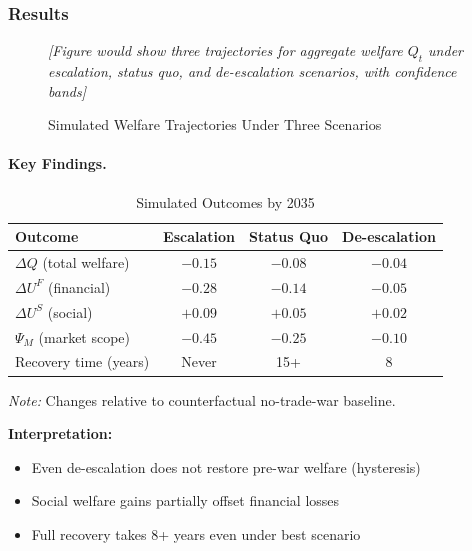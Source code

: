 \subsubsection{Results}

\begin{figure}[htbp]
\centering
\caption{Simulated Welfare Trajectories Under Three Scenarios}
\label{fig:scenarios}
\begin{center}
\textit{[Figure would show three trajectories for aggregate welfare $Q_t$ under escalation, status quo, and de-escalation scenarios, with confidence bands]}
\end{center}
\end{figure}

\paragraph{Key Findings.}

\begin{table}[htbp]
\centering
\caption{Simulated Outcomes by 2035}
\label{tab:simulation-results}
\begin{tabular}{@{}lccc@{}}
\toprule
\textbf{Outcome} & \textbf{Escalation} & \textbf{Status Quo} & \textbf{De-escalation} \\
\midrule
$\Delta Q$ (total welfare) & $-0.15$ & $-0.08$ & $-0.04$ \\
$\Delta U^F$ (financial) & $-0.28$ & $-0.14$ & $-0.05$ \\
$\Delta U^S$ (social) & $+0.09$ & $+0.05$ & $+0.02$ \\
$\Psi_M$ (market scope) & $-0.45$ & $-0.25$ & $-0.10$ \\
Recovery time (years) & Never & 15+ & 8 \\
\bottomrule
\end{tabular}
\begin{flushleft}
\small\textit{Note:} Changes relative to counterfactual no-trade-war baseline.
\end{flushleft}
\end{table}

\textbf{Interpretation:}
\begin{itemize}
    \item Even de-escalation does not restore pre-war welfare (hysteresis)
    \item Social welfare gains partially offset financial losses
    \item Full recovery takes 8+ years even under best scenario
\end{itemize}

